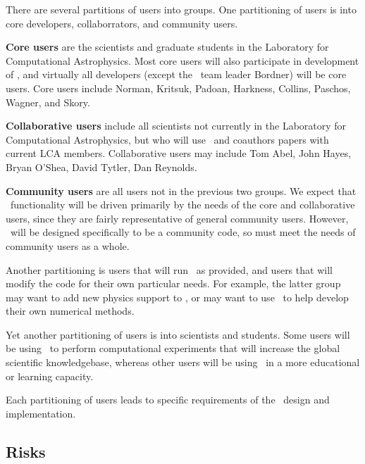 \documentclass{article}
\begin{document}
    There are several partitions of users into groups.  One
    partitioning of users is into core developers, collaborrators, and
    community users.

    \textbf{Core users} are the scientists and graduate students in
    the Laboratory for Computational Astrophysics.  Most core users
    will also participate in development of \cello, and virtually all
    developers (except the \cello\ team leader Bordner) will be core
    users.  Core users include Norman, Kritsuk, Padoan, Harkness,
    Collins, Paschos, Wagner, and Skory.

    \textbf{Collaborative users} include all scientists not currently
    in the Laboratory for Computational Astrophysics, but who will use
    \cello\ and coauthors papers with current LCA members.
    Collaborative users may include Tom Abel, John Hayes, Bryan
    O'Shea, David Tytler, Dan Reynolds.

    \textbf{Community users} are all users not in the previous two
    groups.  We expect that \cello\ functionality will be driven
    primarily by the needs of the core and collaborative users, since
    they are fairly representative of general community users.
    However, \cello\ will be designed specifically to be a community
    code, so must meet the needs of community users as a whole.

    Another partitioning is users that will run \cello\ as provided,
    and users that will modify the code for their own particular
    needs.  For example, the latter group may want to add new physics
    support to \cello, or may want to use \cello\ to help develop
    their own numerical methods.

    Yet another partitioning of users is into scientists and students.
    Some users will be using \cello\ to perform computational
    experiments that will increase the global scientific knowledgebase,
    whereas other users will be using \cello\ in a more educational
    or learning capacity.

    Each partitioning of users leads to specific requirements of the
    \cello\ design and implementation.

\subsection{Risks}
\end{document}
